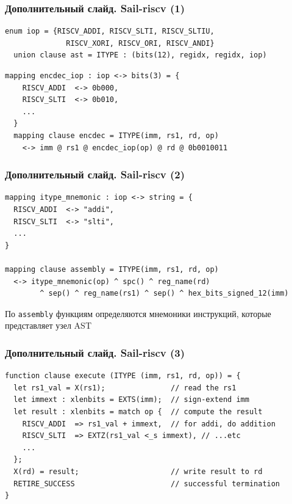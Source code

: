 \documentclass
  [ russian
  , aspectratio=169 %
  ] {beamer}
\begin{document}
\begin{frame}[fragile]
    \frametitle{Дополнительный слайд. Sail-riscv (1)}

    \begin{lstlisting}[caption={Пример узла AST, представляющего инструкции \texttt{addi}, \texttt{slti}, \texttt{sltiu}, \texttt{andi}, \texttt{ori} и \texttt{xori}}, language=sail, frame=single, label=itype]
  enum iop = {RISCV_ADDI, RISCV_SLTI, RISCV_SLTIU,
              RISCV_XORI, RISCV_ORI, RISCV_ANDI}
  union clause ast = ITYPE : (bits(12), regidx, regidx, iop)
\end{lstlisting}

    \begin{lstlisting}[caption={Функция кодирования/декодирования}, language=sail, frame=single]
  mapping encdec_iop : iop <-> bits(3) = {
    RISCV_ADDI  <-> 0b000,
    RISCV_SLTI  <-> 0b010,
    ...
  }
  mapping clause encdec = ITYPE(imm, rs1, rd, op)
    <-> imm @ rs1 @ encdec_iop(op) @ rd @ 0b0010011
    \end{lstlisting}


\end{frame}

\begin{frame}[fragile]
    \frametitle{Дополнительный слайд. Sail-riscv (2)}

    \begin{lstlisting}[caption={Пример функции \texttt{assembly} (отображает узлы AST в мнемоники) для узла с листинга \protect\ref{itype}}, language=sail, frame=single]
mapping itype_mnemonic : iop <-> string = {
  RISCV_ADDI  <-> "addi",
  RISCV_SLTI  <-> "slti",
  ...
}

mapping clause assembly = ITYPE(imm, rs1, rd, op)
  <-> itype_mnemonic(op) ^ spc() ^ reg_name(rd)
        ^ sep() ^ reg_name(rs1) ^ sep() ^ hex_bits_signed_12(imm)
\end{lstlisting}

    По \texttt{assembly} функциям определяются мнемоники инструкций, которые представляет узел AST

\end{frame}

\begin{frame}[fragile]
    \frametitle{Дополнительный слайд. Sail-riscv (3)}

    \begin{lstlisting}[caption={Пример определения семантики исполнения инструкций \texttt{addi}, \texttt{slti}, \texttt{sltiu}, \texttt{andi}, \texttt{ori} и \texttt{xori}. Анализатор специализирует тело функции по параметру \texttt{op}}, language=sail, frame=single]
function clause execute (ITYPE (imm, rs1, rd, op)) = {
  let rs1_val = X(rs1);               // read the rs1
  let immext : xlenbits = EXTS(imm);  // sign-extend imm
  let result : xlenbits = match op {  // compute the result
    RISCV_ADDI  => rs1_val + immext,  // for addi, do addition
    RISCV_SLTI  => EXTZ(rs1_val <_s immext), // ...etc
    ...
  };
  X(rd) = result;                     // write result to rd
  RETIRE_SUCCESS                      // successful termination
}
\end{lstlisting}

\end{frame}
\end{document}
